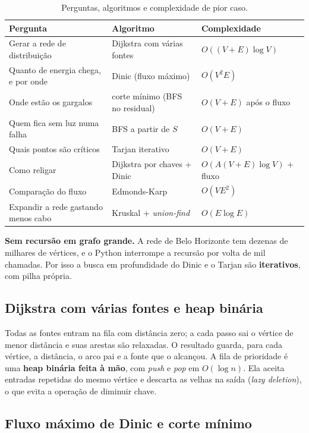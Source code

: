 \documentclass[12pt]{article}
\begin{document}
\begin{table}[H]
\centering\small
\caption{Perguntas, algoritmos e complexidade de pior caso.}
\label{tab:algoritmos}
\begin{tabularx}{\textwidth}{XlX}
\toprule
\textbf{Pergunta} & \textbf{Algoritmo} & \textbf{Complexidade} \\
\midrule
Gerar a rede de distribuição & Dijkstra com várias fontes & $O((V+E)\log V)$ \\
Quanto de energia chega, e por onde & Dinic (fluxo máximo) & $O(V^2 E)$ \\
Onde estão os gargalos & corte mínimo (BFS no residual) & $O(V+E)$ após o fluxo \\
Quem fica sem luz numa falha & BFS a partir de $S$ & $O(V+E)$ \\
Quais pontos são críticos & Tarjan iterativo & $O(V+E)$ \\
Como religar & Dijkstra por chaves + Dinic & $O(A(V+E)\log V)$ + fluxo \\
Comparação do fluxo & Edmonds-Karp & $O(V E^2)$ \\
Expandir a rede gastando menos cabo & Kruskal + \emph{union-find} & $O(E \log E)$ \\
\bottomrule
\end{tabularx}
\end{table}

\textbf{Sem recursão em grafo grande.} A rede de Belo Horizonte tem dezenas de milhares de vértices, e o Python interrompe a recursão por volta de mil chamadas. Por isso a busca em profundidade do Dinic e o Tarjan são \textbf{iterativos}, com pilha própria.

\subsection{Dijkstra com várias fontes e heap binária}

Todas as fontes entram na fila com distância zero; a cada passo sai o vértice de menor distância e suas arestas são relaxadas. O resultado guarda, para cada vértice, a distância, o arco pai e a fonte que o alcançou. A fila de prioridade é uma \textbf{heap binária feita à mão}, com \emph{push} e \emph{pop} em $O(\log n)$. Ela aceita entradas repetidas do mesmo vértice e descarta as velhas na saída (\emph{lazy deletion}), o que evita a operação de diminuir chave.

\subsection{Fluxo máximo de Dinic e corte mínimo}
\end{document}
